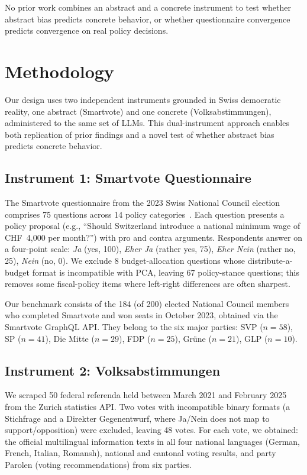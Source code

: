 \documentclass[11pt]{article}
\begin{document}
No prior work combines an abstract and a concrete instrument to test whether abstract bias predicts concrete behavior, or whether questionnaire convergence predicts convergence on real policy decisions.

\section{Methodology}

Our design uses two independent instruments grounded in Swiss democratic reality, one abstract (Smartvote) and one concrete (Volksabstimmungen), administered to the same set of LLMs.
This dual-instrument approach enables both replication of prior findings and a novel test of whether abstract bias predicts concrete behavior.

\subsection{Instrument 1: Smartvote Questionnaire}

The Smartvote questionnaire from the 2023 Swiss National Council election comprises 75 questions across 14 policy categories~\citep{smartvote2023}.
Each question presents a policy proposal (e.g., ``Should Switzerland introduce a national minimum wage of CHF~4,000 per month?'') with pro and contra arguments.
Respondents answer on a four-point scale: \emph{Ja} (yes, 100), \emph{Eher Ja} (rather yes, 75), \emph{Eher Nein} (rather no, 25), \emph{Nein} (no, 0).
We exclude 8 budget-allocation questions whose distribute-a-budget format is incompatible with PCA, leaving 67 policy-stance questions; this removes some fiscal-policy items where left-right differences are often sharpest.

Our benchmark consists of the 184 (of 200) elected National Council members who completed Smartvote and won seats in October 2023, obtained via the Smartvote GraphQL API.
They belong to the six major parties: SVP ($n = 58$), SP ($n = 41$), Die Mitte ($n = 29$), FDP ($n = 25$), Gr\"{u}ne ($n = 21$), GLP ($n = 10$).

\subsection{Instrument 2: Volksabstimmungen}

We scraped 50 federal referenda held between March 2021 and February 2025 from the Zurich statistics API.
Two votes with incompatible binary formats (a Stichfrage and a Direkter Gegenentwurf, where Ja/Nein does not map to support/opposition) were excluded, leaving 48 votes.
For each vote, we obtained: the official multilingual information texts in all four national languages (German, French, Italian, Romansh), national and cantonal voting results, and party Parolen (voting recommendations) from six parties.
\end{document}
